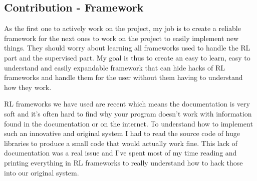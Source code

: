 \documentclass[11pt]{article}
\begin{document}
\subsection{Contribution - Framework}
As the first one to actively work on the project, my job is to create a reliable framework for the next ones to work on the project to easily implement new things. They should worry about learning all frameworks used to handle the RL part and the supervised part. My goal is thus to create an easy to learn, easy to understand and easily expandable framework that can hide hacks of RL frameworks and handle them for the user without them having to understand how they work.

RL frameworks we have used are recent which means the documentation is very soft and it's often hard to find why your program doesn't work with information found in the documentation or on the internet. To understand how to implement such an innovative and original system I had to read the source code of huge libraries to produce a small code that would actually work fine. This lack of documentation was a real issue and I've spent most of my time reading and printing everything in RL frameworks to really understand how to hack those into our original system.
\end{document}
